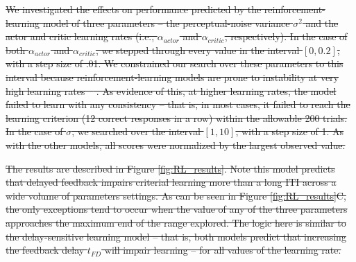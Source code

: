 \documentclass[doc, floatsintext]{apa7}
\providecommand{\DIFdel}[1]{{\protect\color{red}\sout{#1}}}                      %
\begin{document}
\DIFdel{We investigated the effects on performance predicted by the
reinforcement-learning model of three parameters -- the
perceptual-noise variance $\sigma^2$ and the actor and
critic learning rates (i.e., $\alpha_{actor}$ and
$\alpha_{critic}$, respectively). In the case of both
$\alpha_{actor}$ and $\alpha_{critic}$, we stepped through
every value in the interval $[0, 0.2]$, with a step size of
.01. We constrained our search over these parameters to this
interval because reinforcement-learning models are prone to
instability at very high learning rates
\mbox{%
\parencite{SuttonBarto1998}}\hskip0pt%
. As evidence of this, at higher
learning rates, the model failed to learn with any
consistency -- that is, in most cases, it failed to reach
the learning criterion (12 correct responses in a row)
within the allowable 200 trials. In the case of $\sigma$, we
searched over the interval $[1, 10]$, 
with a step size of 1.
As with the other models, all scores were normalized by the
largest observed value.
}%

\DIFdel{The results are described in Figure \ref{fig:RL_results}.
Note this model predicts that delayed feedback impairs
criterial learning more than a long ITI across a wide volume
of parameters settings. As can be seen in Figure
\ref{fig:RL_results}C, the only exceptions tend to occur
when the value of any of the three parameters approaches the
maximum end of the range explored. The logic here is similar
to the delay-sensitive learning model -- that is, both
models predict that increasing the feedback delay $t_{FD}$
will impair learning -- for all values of the learning rate.
}%
\end{document}
